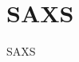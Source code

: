 \documentclass[\main/dresen_thesis.tex]{subfiles}
\begin{document}
  \section{SAXS}
    \label{app:methods:saxs}
    SAXS
\end{document}
